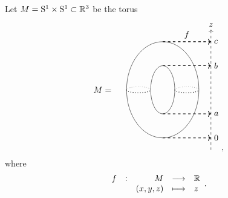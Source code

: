 \begin{example}
\label{eg:3.5}
Let $ M = \mathrm{S}^1 \times \mathrm{S}^1 \subset \mathbb{R}^3 $ be the torus
$$
\begin{tikzpicture}
\draw (-2.5, 0) node{$ M = $};
\draw (0, 0) ellipse (1.5 and 2);
\draw (0, 0) ellipse (0.5 and 1);
\draw [dotted, thick] (-1.5, 0) arc (-180:0:0.5 and 0.125);
\draw [dotted, thick] (0.5, 0) arc (-180:0:0.5 and 0.125);
\draw [dotted] (-1.5, 0) arc (180:0:0.5 and 0.125);
\draw [dotted] (0.5, 0) arc (180:0:0.5 and 0.125);
\draw [->, dashed] (2, -2.5) to (2, 2.5) node[above]{$ z $};
\draw (1, 2) node[above]{$ f $};
\draw [->, dashed, thick] (0, -2) to (2, -2) node[right]{$ 0 $};
\draw [->, dashed, thick] (0, -1) to (2, -1) node[right]{$ a $};
\draw [->, dashed, thick] (0, 1) to (2, 1) node[right]{$ b $};
\draw [->, dashed, thick] (0, 2) to (2, 2) node[right]{$ c $};
\end{tikzpicture},
$$
where
$$ \function[f]{M}{\RR}{\br{x, y, z}}{z}. $$

\pagebreak


\end{example}
